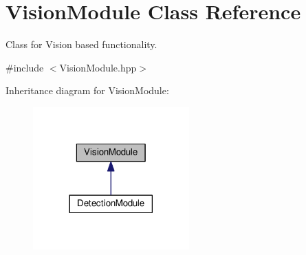 \hypertarget{classVisionModule}{}\section{Vision\+Module Class Reference}
\label{classVisionModule}


Class for Vision based functionality.  




{\ttfamily \#include $<$Vision\+Module.\+hpp$>$}



Inheritance diagram for Vision\+Module\+:\nopagebreak
\begin{figure}[H]
\begin{center}
\leavevmode
\includegraphics[width=170pt]{classVisionModule__inherit__graph}
\end{center}
\end{figure}
